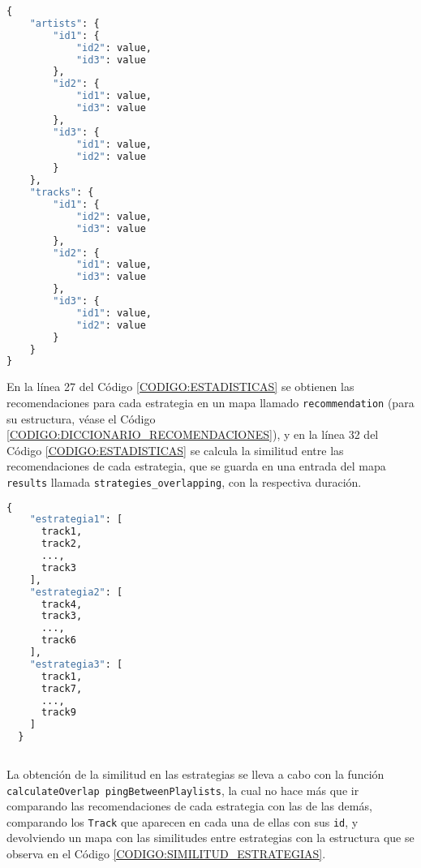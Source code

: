 \begin{lstlisting}[language=python, caption=Diccionario de similitud entre usuarios, label=CODIGO:SIMILITUD_USUARIOS]
  {
    "artists": {
        "id1": {
            "id2": value,
            "id3": value
        },
        "id2": {
            "id1": value,
            "id3": value
        },
        "id3": {
            "id1": value,
            "id2": value
        }
    },
    "tracks": {
        "id1": {
            "id2": value,
            "id3": value
        },
        "id2": {
            "id1": value,
            "id3": value
        },
        "id3": {
            "id1": value,
            "id2": value
        }
    }
}
\end{lstlisting}
En la línea 27 del Código \ref{CODIGO:ESTADISTICAS} se obtienen las recomendaciones para cada estrategia en un mapa 
llamado \texttt{recommendation} (para su estructura, véase el Código \ref{CODIGO:DICCIONARIO_RECOMENDACIONES}), y en la línea 32 del Código \ref{CODIGO:ESTADISTICAS} 
se calcula la similitud entre las recomendaciones de cada estrategia, que se guarda en una entrada del mapa 
\texttt{results} llamada \texttt{strategies\_overlapping}, con la respectiva duración.

\begin{lstlisting}[language=python, caption=Diccionario de recomendaciones, label=CODIGO:DICCIONARIO_RECOMENDACIONES]
  {
    "estrategia1": [
      track1,
      track2,
      ...,
      track3
    ],
    "estrategia2": [
      track4,
      track3,
      ...,
      track6
    ],
    "estrategia3": [
      track1,
      track7,
      ...,
      track9
    ]
  }
  
\end{lstlisting}

La obtención de la similitud en las estrategias se lleva a cabo con la función \texttt{calculateOverlap pingBetweenPlaylists}, la cual no hace más que 
ir comparando las recomendaciones de cada estrategia con las de las demás, comparando los \texttt{Track} que aparecen en cada una de ellas con sus \texttt{id}, 
y devolviendo un mapa con las similitudes entre estrategias con la estructura que se observa en el Código \ref{CODIGO:SIMILITUD_ESTRATEGIAS}.

